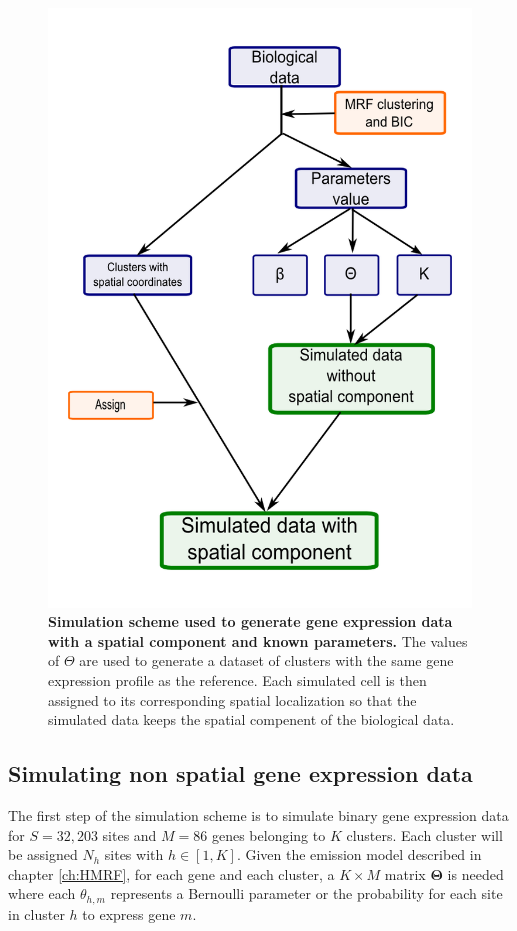 	\begin{figure}[H]
\centerline{\includegraphics[width=0.8\linewidth]{gfx/chapter5/simulation_scheme.png}}
\caption{{\bf Simulation scheme used to generate gene expression data with a spatial component and known parameters.} The values of $\Theta$ are used to generate a dataset of clusters with the same gene expression profile as the reference. Each simulated cell is then assigned to its corresponding spatial localization so that the simulated data keeps the spatial compenent of the biological data.}
\label{fig:simulationScheme}
	\end{figure}
	
	\subsection{Simulating non spatial gene expression data}\label{subsec:simul_non_spatial}
	The first step of the simulation scheme is to simulate binary gene expression data for $S=32,203$ sites and $M=86$ genes belonging to $K$ clusters. Each cluster will be assigned $N_h$ sites with $h \in [1,K]$. Given the emission model described in chapter \ref{ch:HMRF}, for each gene and each cluster, a $K \times M$ matrix $\boldsymbol{\Theta}$ is needed where each $\theta_{h,m}$ represents a Bernoulli parameter or the probability for each site in cluster $h$ to express gene $m$.\\
	
